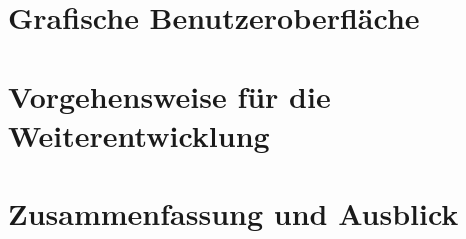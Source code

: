 \documentclass[12pt,a4paper,twoside,openany]{report}
\begin{document}
\chapter{Grafische Benutzeroberfläche}
{


}

\chapter{Vorgehensweise für die Weiterentwicklung}
{

}


\chapter{Zusammenfassung und Ausblick}




\appendix
\end{document}
